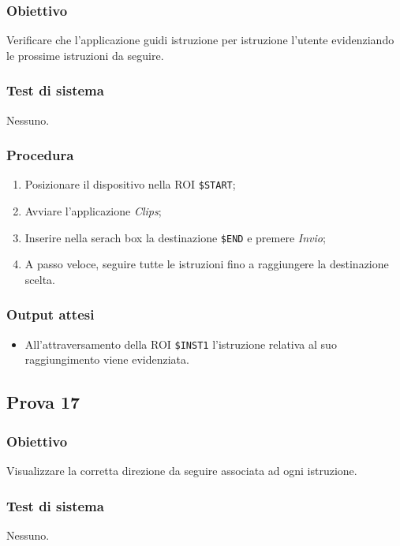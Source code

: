 \documentclass[../Sperimentazione.tex]{subfiles}
\begin{document}
	\subsubsection{Obiettivo}
		Verificare che l'applicazione guidi istruzione per istruzione l'utente evidenziando le prossime istruzioni da seguire.
		
	\subsubsection{Test di sistema}
		Nessuno.
		
	\subsubsection{Procedura}
		\begin{enumerate}
		\item Posizionare il dispositivo nella ROI  \verb|$START|;
		\item Avviare l'applicazione \textit{Clips};
		\item Inserire nella serach box la destinazione  \verb|$END| e premere \textit{Invio};
		\item A passo veloce, seguire tutte le istruzioni fino a raggiungere la destinazione scelta.
		\end{enumerate}
		
	\subsubsection{Output attesi}
		\begin{itemize}
		\item All'attraversamento della ROI  \verb|$INST1| l'istruzione relativa al suo raggiungimento viene evidenziata.
		\end{itemize}

	
		
\newpage	
\subsection{Prova 17} %
\label{subsec:Prova17}	
	
	\subsubsection{Obiettivo}
		Visualizzare la corretta direzione da seguire associata ad ogni istruzione.
		
	\subsubsection{Test di sistema}
		Nessuno.
		
\end{document}
